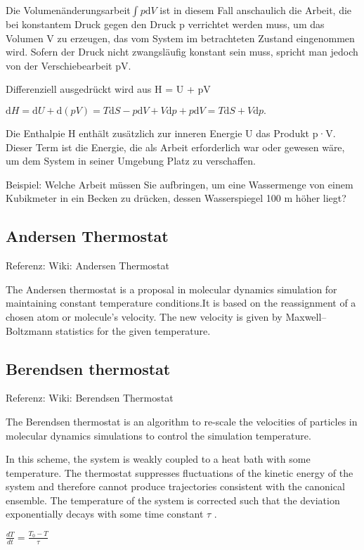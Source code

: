 \documentclass[]{article}
\begin{document}
Die Volumenänderungsarbeit$ \int{p \mathrm dV}$ ist in diesem Fall anschaulich die Arbeit, die bei konstantem Druck gegen den Druck p verrichtet werden muss, um das Volumen V zu erzeugen, das vom System im betrachteten Zustand eingenommen wird. Sofern der Druck nicht zwangsläufig konstant sein muss, spricht man jedoch von der Verschiebearbeit pV.

Differenziell ausgedrückt wird aus H = U + pV

$\mathrm dH = \mathrm dU + \mathrm d(pV) = T \mathrm dS - p \mathrm dV + V \mathrm dp + p \mathrm dV = T\mathrm dS + V \mathrm dp. $

Die Enthalpie H enthält zusätzlich zur inneren Energie U das Produkt p·V. Dieser Term ist die Energie, die als Arbeit erforderlich war oder gewesen wäre, um dem System in seiner Umgebung Platz zu verschaffen.

Beispiel: Welche Arbeit müssen Sie aufbringen, um eine Wassermenge von einem Kubikmeter in ein Becken zu drücken, dessen Wasserspiegel 100 m höher liegt?

\subsection{Andersen Thermostat}
Referenz: Wiki: Andersen Thermostat

The Andersen thermostat is a proposal in molecular dynamics simulation for maintaining constant temperature conditions.It is based on the reassignment of a chosen atom or molecule's velocity. The new velocity is given by Maxwell–Boltzmann statistics for the given temperature.

\subsection{Berendsen thermostat}
Referenz: Wiki: Berendsen Thermostat

The Berendsen thermostat is an algorithm to re-scale the velocities of particles in molecular dynamics simulations to control the simulation temperature.

In this scheme, the system is weakly coupled to a heat bath with some temperature. The thermostat suppresses fluctuations of the kinetic energy of the system and therefore cannot produce trajectories consistent with the canonical ensemble. The temperature of the system is corrected such that the deviation exponentially decays with some time constant $\tau$ .

$\frac{dT}{dt}=\frac{T_0-T}{\tau}$
\end{document}
